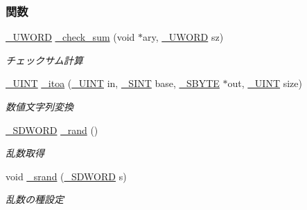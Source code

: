 \subsubsection*{関数}
\begin{DoxyCompactItemize}
\item 
\hyperlink{stddef_8h_af4b45f5ec97da370bd2173b4fe891d76_af4b45f5ec97da370bd2173b4fe891d76}{\+\_\+\+U\+W\+O\+R\+D} \hyperlink{stdlib_8h_ae621ec4eb313512cd46c749a0d9583b7_ae621ec4eb313512cd46c749a0d9583b7}{\+\_\+check\+\_\+sum} (void $\ast$ary, \hyperlink{stddef_8h_af4b45f5ec97da370bd2173b4fe891d76_af4b45f5ec97da370bd2173b4fe891d76}{\+\_\+\+U\+W\+O\+R\+D} sz)
\begin{DoxyCompactList}\small\item\em チェックサム計算 \end{DoxyCompactList}\item 
\hyperlink{stddef_8h_af1d4b529b856acadd9e1b43f5d794d24_af1d4b529b856acadd9e1b43f5d794d24}{\+\_\+\+U\+I\+N\+T} \hyperlink{stdlib_8h_a6c4af00cd660a34b8a46424194ae4f7f_a6c4af00cd660a34b8a46424194ae4f7f}{\+\_\+itoa} (\hyperlink{stddef_8h_af1d4b529b856acadd9e1b43f5d794d24_af1d4b529b856acadd9e1b43f5d794d24}{\+\_\+\+U\+I\+N\+T} in, \hyperlink{stddef_8h_aefd1068e35d26c0e7d7079ddf2579174_aefd1068e35d26c0e7d7079ddf2579174}{\+\_\+\+S\+I\+N\+T} base, \hyperlink{stddef_8h_aab65237ca9fbf4192a39cf12dd165942_aab65237ca9fbf4192a39cf12dd165942}{\+\_\+\+S\+B\+Y\+T\+E} $\ast$out, \hyperlink{stddef_8h_af1d4b529b856acadd9e1b43f5d794d24_af1d4b529b856acadd9e1b43f5d794d24}{\+\_\+\+U\+I\+N\+T} size)
\begin{DoxyCompactList}\small\item\em 数値文字列変換 \end{DoxyCompactList}\item 
\hyperlink{stddef_8h_a931e4fd9bf350284fc21e94cd5ee126f_a931e4fd9bf350284fc21e94cd5ee126f}{\+\_\+\+S\+D\+W\+O\+R\+D} \hyperlink{stdlib_8h_a116df1dac9168ab8f49c08f34c1e316e_a116df1dac9168ab8f49c08f34c1e316e}{\+\_\+rand} ()
\begin{DoxyCompactList}\small\item\em 乱数取得 \end{DoxyCompactList}\item 
void \hyperlink{stdlib_8h_a7f79ebf65f54b48399029275b2e007b3_a7f79ebf65f54b48399029275b2e007b3}{\+\_\+srand} (\hyperlink{stddef_8h_a931e4fd9bf350284fc21e94cd5ee126f_a931e4fd9bf350284fc21e94cd5ee126f}{\+\_\+\+S\+D\+W\+O\+R\+D} s)
\begin{DoxyCompactList}\small\item\em 乱数の種設定 \end{DoxyCompactList}\end{DoxyCompactItemize}


